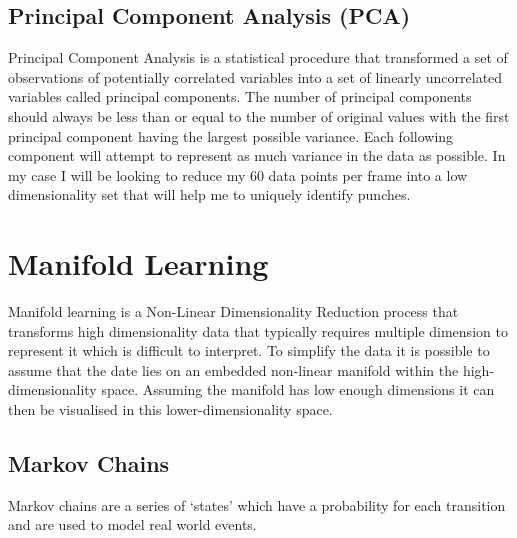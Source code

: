 \subsection{Principal Component Analysis (PCA)}
\label{subsec:subsec01}
Principal Component Analysis is a statistical procedure that transformed a set of observations of potentially correlated variables into a set of linearly uncorrelated variables called principal components. The number of principal components should always be less than or equal to the number of original values with the first principal component having the largest possible variance. Each following component will attempt to represent as much variance in the data as possible. In my case I will be looking to reduce my 60 data points per frame into a low dimensionality set that will help me to uniquely identify punches.


\section{Manifold Learning}
Manifold learning is a Non-Linear Dimensionality Reduction process that transforms high dimensionality data that typically requires multiple dimension to represent it which is difficult to interpret. To simplify the data it is possible to assume that the date lies on an embedded non-linear manifold within the high-dimensionality space. Assuming the manifold has low enough dimensions it can then be visualised in this lower-dimensionality space.

\subsection{Markov Chains}
Markov chains are a series of `states' which have a probability for each transition and are used to model real world events.

